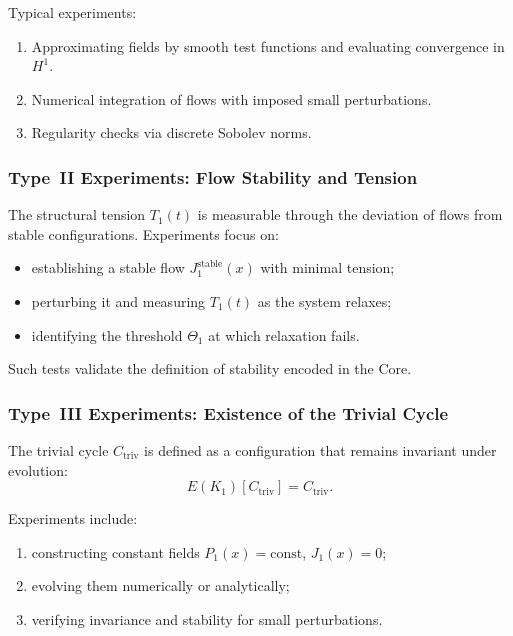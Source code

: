 Typical experiments:

\begin{enumerate}
    \item Approximating fields by smooth test functions and evaluating 
          convergence in $H^1$.
    \item Numerical integration of flows with imposed small perturbations.
    \item Regularity checks via discrete Sobolev norms.
\end{enumerate}


\subsubsection{Type~II Experiments: Flow Stability and Tension}

The structural tension $T_1(t)$ is measurable through the deviation of flows
from stable configurations.  
Experiments focus on:

\begin{itemize}
    \item establishing a stable flow $J_1^{\mathrm{stable}}(x)$ with minimal tension;
    \item perturbing it and measuring $T_1(t)$ as the system relaxes;
    \item identifying the threshold $\Theta_1$ at which relaxation fails.
\end{itemize}

Such tests validate the definition of stability encoded in the Core.


\subsubsection{Type~III Experiments: Existence of the Trivial Cycle}

The trivial cycle $C_{\mathrm{triv}}$ is defined as a configuration that
remains invariant under evolution:
\[
    E(K_1)[C_{\mathrm{triv}}] = C_{\mathrm{triv}}.
\]

Experiments include:

\begin{enumerate}
    \item constructing constant fields $P_1(x)=\mathrm{const}$,
          $J_1(x)=0$;
    \item evolving them numerically or analytically;
    \item verifying invariance and stability for small perturbations.
\end{enumerate}

